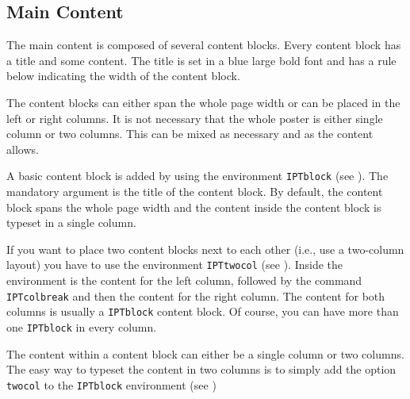 


\subsection{Main Content} %

The main content is composed of several content blocks. Every content block has a title and some content. The title is set in a blue large bold font and has a rule below indicating the width of the content block.

The content blocks can either span the whole page width or can be placed in the left or right columns. It is not necessary that the whole poster is either single column or two columns. This can be mixed as necessary and as the content allows.

A basic content block is added by using the environment \texttt{IPTblock} (see ). The mandatory argument is the title of the content block. By default, the content block spans the whole page width and the content inside the content block is typeset in a single column.


If you want to place two content blocks next to each other (i.e., use a two-column layout) you have to use the environment \texttt{IPTtwocol} (see ). Inside the environment is the content for the left column, followed by the command \texttt{\bs{}IPTcolbreak} and then the content for the right column. The content for both columns is usually a \texttt{IPTblock} content block. Of course, you can have more than one \texttt{IPTblock} in every column.



The content within a content block can either be a single column or two columns. The easy way to typeset the content in two columns is to simply add the option \texttt{twocol} to the \texttt{IPTblock} environment (see )

